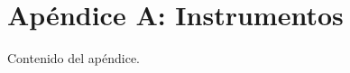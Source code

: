 \chapter{Apéndice A: Instrumentos}

\begin{refsection}
% 

Contenido del apéndice.

\end{refsection}